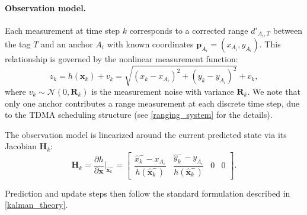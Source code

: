 \paragraph{Observation model.}

Each measurement at time step $k$ corresponds to a corrected range $d'_{A_i,T}$ between the tag $T$ and an anchor $A_i$ with known coordinates $\mathbf{p}_{A_i} = (x_{A_i}, y_{A_i})$. This relationship is governed by the nonlinear measurement function:
\begin{equation}
    z_k = h(\mathbf{x}_k) + v_k = \sqrt{(x_k - x_{A_i})^2 + (y_k - y_{A_i})^2} + v_k,
\end{equation}
where $v_k \sim \mathcal{N}(0, \mathbf{R}_k)$ is the measurement noise with variance $\mathbf{R}_k$. We note that only one anchor contributes a range measurement at each discrete time step, due to the TDMA scheduling structure (see \autoref{ranging_system} for the details).

The observation model is linearized around the current predicted state via its Jacobian $\mathbf{H}_k$:
\begin{equation}
\mathbf{H}_k = \frac{\partial h}{\partial \mathbf{x}} \big|_{\hat{\mathbf{x}}_k^-} = 
\begin{bmatrix}
    \dfrac{\hat{x}_k^- - x_{A_i}}{h(\hat{\mathbf{x}}_k^-)} &
    \dfrac{\hat{y}_k^- - y_{A_i}}{h(\hat{\mathbf{x}}_k^-)} &
    0 & 0
\end{bmatrix}.
\end{equation}

Prediction and update steps then follow the standard formulation described in \autoref{kalman_theory}.



